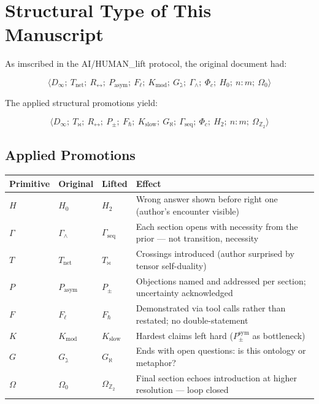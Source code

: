 \documentclass[12pt,a4paper]{article}
\begin{document}
\section{Structural Type of This Manuscript}

As imscribed in the AI/HUMAN\_lift protocol, the original document had:

\[\langle D_{\infty};\ T_\text{net};\ R_{\leftrightarrow};\ P_\text{asym};\ F_{\ell};\ K_\text{mod};\ G_{\gimel};\ \Gamma_{\wedge};\ \Phi_c;\ H_0;\ n{:}m;\ \Omega_0 \rangle\]

The applied structural promotions yield:

\[\langle D_{\infty};\ T_{\bowtie};\ R_{\leftrightarrow};\ P_{\pm};\ F_{\hbar};\ K_\text{slow};\ G_{\aleph};\ \Gamma_\text{seq};\ \Phi_c;\ H_2;\ n{:}m;\ \Omega_{\mathbb{Z}_2} \rangle\]

\subsection{Applied Promotions}

\begin{table}[htbp]
\centering
\small
\begin{tabularx}{\textwidth}{>{\centering\arraybackslash}X >{\centering\arraybackslash}X >{\centering\arraybackslash}X >{\centering\arraybackslash}X}
\toprule
\rowcolor{gray!25}\textbf{Primitive} & \textbf{Original} & \textbf{Lifted} & \textbf{Effect} \\
\midrule
$H$ & $H_0$ & $H_2$ & Wrong answer shown before right one (author's encounter visible) \\
$\Gamma$ & $\Gamma_{\wedge}$ & $\Gamma_\text{seq}$ & Each section opens with necessity from the prior --- not transition, necessity \\
$T$ & $T_\text{net}$ & $T_{\bowtie}$ & Crossings introduced (author surprised by tensor self-duality) \\
$P$ & $P_\text{asym}$ & $P_{\pm}$ & Objections named and addressed per section; uncertainty acknowledged \\
$F$ & $F_{\ell}$ & $F_{\hbar}$ & Demonstrated via tool calls rather than restated; no double-statement \\
$K$ & $K_\text{mod}$ & $K_\text{slow}$ & Hardest claims left hard ($P_{\pm}^{\text{sym}}$ as bottleneck) \\
$G$ & $G_{\gimel}$ & $G_{\aleph}$ & Ends with open questions: is this ontology or metaphor? \\
$\Omega$ & $\Omega_0$ & $\Omega_{\mathbb{Z}_2}$ & Final section echoes introduction at higher resolution --- loop closed \\
\bottomrule
\end{tabularx}
\end{table}
\end{document}
